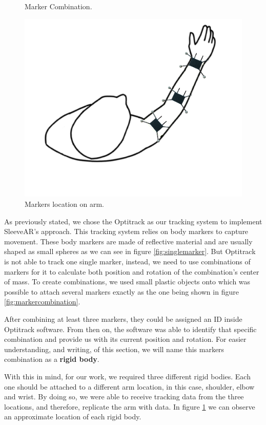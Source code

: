 \begin{figure}
    \caption{Marker Combination.}
    \label{fig:markercombination}
    \endminipage\hfill
{}
  \centering
  \includegraphics[width=\linewidth]{imgs/impl/rigidbodiesattached}
    \caption{Markers location on arm.}
    \label{fig:rigidbodiesattached}
    \endminipage
\end{figure}


As previously stated, we chose the Optitrack as our tracking system to implement SleeveAR's approach. This tracking system relies on body markers to capture movement.
These body markers are made of reflective material and are usually shaped as small spheres as we can see in figure \ref{fig:singlemarker}.
But Optitrack is not able to track one single marker, instead, we need to use combinations of markers for it to calculate both 
position and rotation of the combination's center of mass. 
To create combinations, we used small plastic objects onto which was possible to attach several markers exactly as the one being shown in figure \ref{fig:markercombination}.

After combining at least three markers, they could be assigned an ID inside Optitrack software. 
From then on, the software was able to identify that specific combination and provide us with its current position and rotation.
For easier understanding, and writing, of this section, we will name this markers combination as a \textbf{rigid body}.

With this in mind, for our work, we required three different rigid bodies. Each one should be attached to a different arm location, in this case, shoulder, elbow and wrist. 
By doing so, we were able to receive tracking data from the three locations, and therefore, replicate the arm with data. In figure \ref{fig:rigidbodiesattached} we can observe
an approximate location of each rigid body.

